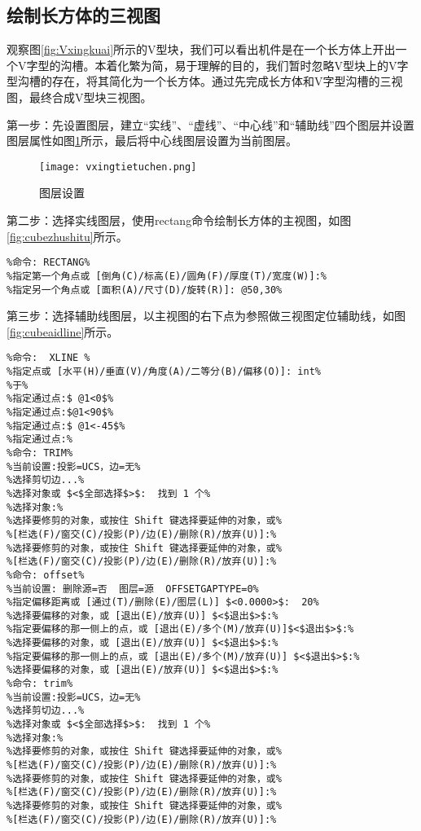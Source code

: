 \subsection{绘制长方体的三视图}
观察图\ref{fig:Vxingkuai}所示的V型块，我们可以看出机件是在一个长方体上开出一个V字型的沟槽。本着化繁为简，易于理解的目的，我们暂时忽略V型块上的V字型沟槽的存在，将其简化为一个长方体。通过先完成长方体和V字型沟槽的三视图，最终合成V型块三视图。

第一步：先设置图层，建立“实线”、“虚线”、“中心线”和“辅助线”四个图层并设置图层属性如图\ref{fig:vxintuchen}所示，最后将中心线图层设置为当前图层。
\begin{figure}[htpb]
\centering
\texttt{[image: vxingtietuchen.png]}
\caption{图层设置}\label{fig:vxintuchen}
\end{figure}

第二步：选择实线图层，使用rectang命令绘制长方体的主视图，如图\ref{fig:cubezhushitu}所示。
\begin{lstlisting}
%命令: RECTANG%
%指定第一个角点或 [倒角(C)/标高(E)/圆角(F)/厚度(T)/宽度(W)]:%
%指定另一个角点或 [面积(A)/尺寸(D)/旋转(R)]: @50,30%
\end{lstlisting}
\begin{figure}[htbp]
\centering
\begin{floatrow}
\end{floatrow}
\end{figure}

第三步：选择辅助线图层，以主视图的右下点为参照做三视图定位辅助线，如图\ref{fig:cubeaidline}所示。
\begin{lstlisting}
%命令:  XLINE %
%指定点或 [水平(H)/垂直(V)/角度(A)/二等分(B)/偏移(O)]: int%
%于%
%指定通过点:$ @1<0$%
%指定通过点:$@1<90$%
%指定通过点:$ @1<-45$%
%指定通过点:%
%命令: TRIM%
%当前设置:投影=UCS，边=无%
%选择剪切边...%
%选择对象或 $<$全部选择$>$:  找到 1 个%
%选择对象:%
%选择要修剪的对象，或按住 Shift 键选择要延伸的对象，或%
%[栏选(F)/窗交(C)/投影(P)/边(E)/删除(R)/放弃(U)]:%
%选择要修剪的对象，或按住 Shift 键选择要延伸的对象，或%
%[栏选(F)/窗交(C)/投影(P)/边(E)/删除(R)/放弃(U)]:%
%命令: offset%
%当前设置: 删除源=否  图层=源  OFFSETGAPTYPE=0%
%指定偏移距离或 [通过(T)/删除(E)/图层(L)] $<0.0000>$:  20%
%选择要偏移的对象，或 [退出(E)/放弃(U)] $<$退出$>$:%
%指定要偏移的那一侧上的点，或 [退出(E)/多个(M)/放弃(U)]$<$退出$>$:%
%选择要偏移的对象，或 [退出(E)/放弃(U)] $<$退出$>$:%
%指定要偏移的那一侧上的点，或 [退出(E)/多个(M)/放弃(U)] $<$退出$>$:%
%选择要偏移的对象，或 [退出(E)/放弃(U)] $<$退出$>$:%
%命令: trim%
%当前设置:投影=UCS，边=无%
%选择剪切边...%
%选择对象或 $<$全部选择$>$:  找到 1 个%
%选择对象:%
%选择要修剪的对象，或按住 Shift 键选择要延伸的对象，或%
%[栏选(F)/窗交(C)/投影(P)/边(E)/删除(R)/放弃(U)]:%
%选择要修剪的对象，或按住 Shift 键选择要延伸的对象，或%
%[栏选(F)/窗交(C)/投影(P)/边(E)/删除(R)/放弃(U)]:%
%选择要修剪的对象，或按住 Shift 键选择要延伸的对象，或%
%[栏选(F)/窗交(C)/投影(P)/边(E)/删除(R)/放弃(U)]:%
\end{lstlisting}

